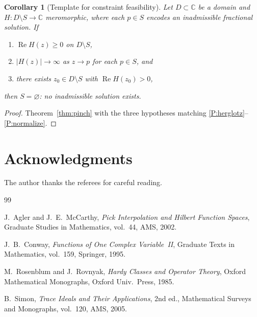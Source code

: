 \documentclass[11pt]{amsart}
\newtheorem{corollary}[theorem]{Corollary}
\theoremstyle{definition}
\theoremstyle{remark}
\newcommand{\C}{\mathbb{C}}
\DeclareMathOperator{\re}{Re}
\begin{document}
\begin{corollary}[Template for constraint feasibility]\label{cor:pvnp}
Let $D\subset\C$ be a domain and $H:D\setminus S\to\C$ meromorphic,
where each $p\in S$ encodes an inadmissible fractional solution.
If
\begin{enumerate}[label=\textup{(\roman*)},nosep]
\item $\re H(z)\ge 0$ on $D\setminus S$,
\item $|H(z)|\to\infty$ as $z\to p$ for each $p\in S$, and
\item there exists $z_0\in D\setminus S$ with $\re H(z_0)>0$,
\end{enumerate}
then $S=\varnothing$: no inadmissible solution exists.
\end{corollary}
\begin{proof}
Theorem~\ref{thm:pinch} with the three hypotheses matching
\ref{P:herglotz}--\ref{P:normalize}.
\end{proof}

\section*{Acknowledgments}
The author thanks the referees for careful reading.

\begin{thebibliography}{99}

J.~Agler and J.~E.~McCarthy,
\emph{Pick Interpolation and Hilbert Function Spaces},
Graduate Studies in Mathematics, vol.~44, AMS, 2002.

J.~B.~Conway,
\emph{Functions of One Complex Variable~II},
Graduate Texts in Mathematics, vol.~159, Springer, 1995.

M.~Rosenblum and J.~Rovnyak,
\emph{Hardy Classes and Operator Theory},
Oxford Mathematical Monographs, Oxford Univ.\ Press, 1985.

B.~Simon,
\emph{Trace Ideals and Their Applications},
2nd ed., Mathematical Surveys and Monographs, vol.~120, AMS, 2005.

\end{thebibliography}
\end{document}
